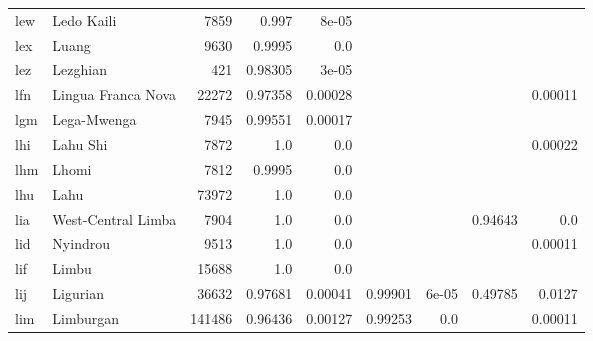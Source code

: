 \documentclass[11pt]{article}
\begin{document}
\begin{table*}[h]
{\begin{tabular}{llrrrrrrr}
lew         & Ledo Kaili         & 7859         & 0.997         & 8e-05         &          &          &          &          \\

lex         & Luang         & 9630         & 0.9995         & 0.0         &          &          &          &          \\

lez         & Lezghian         & 421         & 0.98305         & 3e-05         &          &          &          &          \\

lfn         & Lingua Franca Nova         & 22272         & 0.97358         & 0.00028         &          &          &          & 0.00011         \\

lgm         & Lega-Mwenga         & 7945         & 0.99551         & 0.00017         &          &          &          &          \\

lhi         & Lahu Shi         & 7872         & 1.0         & 0.0         &          &          &          & 0.00022         \\

lhm         & Lhomi         & 7812         & 0.9995         & 0.0         &          &          &          &          \\

lhu         & Lahu         & 73972         & 1.0         & 0.0         &          &          &          &          \\

lia         & West-Central Limba         & 7904         & 1.0         & 0.0         &          &          & 0.94643         & 0.0         \\

lid         & Nyindrou         & 9513         & 1.0         & 0.0         &          &          &          & 0.00011         \\

lif         & Limbu         & 15688         & 1.0         & 0.0         &          &          &          &          \\

lij         & Ligurian         & 36632         & 0.97681         & 0.00041         & 0.99901         & 6e-05         & 0.49785         & 0.0127         \\

lim         & Limburgan         & 141486         & 0.96436         & 0.00127         & 0.99253         & 0.0         &          & 0.00011         \\


\end{tabular}}
\end{table*}
\end{document}
